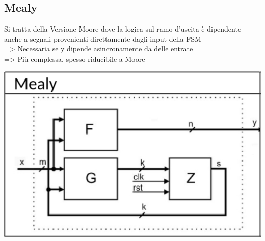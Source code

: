     \subsection{Mealy}
    \begin{minipage}[t]{0.48\columnwidth}
        \vspace{0pt} %
        Si tratta della Versione Moore dove la logica sul ramo d'uscita è dipendente anche a segnali provenienti direttamente
        dagli input della FSM\\
        => Necessaria se y dipende asincronamente da delle entrate\\
        => Più complessa, spesso riducibile a Moore
    \end{minipage}%
    \hfill
    \begin{minipage}[t]{0.48\columnwidth}
        \vspace{0pt} %
        \includegraphics[width=\linewidth]{Images/Mealy.png}
    \end{minipage}



